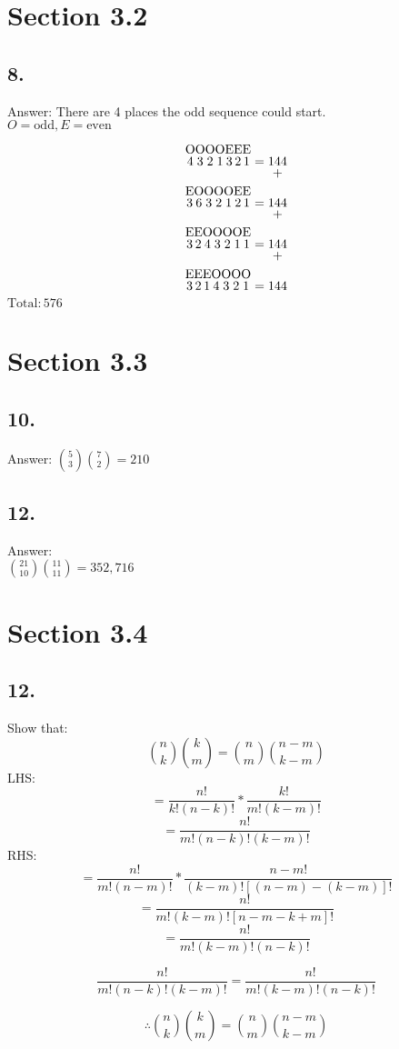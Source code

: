 \documentclass[12pt]{article}
\begin{document}
\begin{minipage}[t]{0.40\textwidth}

\section*{Section 3.2}
\subsection*{8.}
Answer: There are 4 places the odd sequence could start.\\
$ O = \text{odd}, E = \text{even} $

$$ \stackon{4}{O}\stackon{3}{O}\stackon{2}{O}\stackon{1}{O}\stackon{3}{E}\stackon{2}{E}\stackon{1}{E}  = \stackunder{144}{+}
$$
$$ \stackon{3}{E}\stackon{6}{O}\stackon{3}{O}\stackon{2}{O}\stackon{1}{O}\stackon{2}{E}\stackon{1}{E}  = \stackunder{144}{+}
$$
$$ \stackon{3}{E}\stackon{2}{E}\stackon{4}{O}\stackon{3}{O}\stackon{2}{O}\stackon{1}{O}\stackon{1}{E}  = \stackunder{144}{+}
$$
$$ \stackon{3}{E}\stackon{2}{E}\stackon{1}{E}\stackon{4}{O}\stackon{3}{O}\stackon{2}{O}\stackon{1}{O}  = 144
$$
$ \text{Total}: 576 $

\section*{Section 3.3}
\subsection*{10.}
Answer: $ \binom{5}{3}\binom{7}{2} = 210$
\subsection*{12.}
Answer: \\$ \binom{21}{10}\binom{11}{11} =352,716$

\end{minipage}
\hfill\vline\hfill
\begin{minipage}[t]{0.45\textwidth}
\section*{Section 3.4}
\subsection*{12.}
Show that:
\[
\binom{n}{k}\binom{k}{m}=\binom{n}{m}\binom{n-m}{k-m}
\]
LHS:\\
\[=\frac{n!}{k!(n-k)!}*\frac{k!}{m!(k-m)!}\]
\[=\frac{n!}{m!(n-k)!(k-m)!}\]
RHS:\\
\[=\frac{n!}{m!(n-m)!}*\frac{n-m!}{(k-m)![(n-m)-(k-m)]!}\]
\[=\frac{n!}{m!(k-m)![n-m-k+m]!}\]
\[=\frac{n!}{m!(k-m)!(n-k)!}\]

\[\frac{n!}{m!(n-k)!(k-m)!} = \frac{n!}{m!(k-m)!(n-k)!}\]

\[\therefore \binom{n}{k}\binom{k}{m}=\binom{n}{m}\binom{n-m}{k-m}\]

\end{minipage}
\pagebreak
\end{document}
